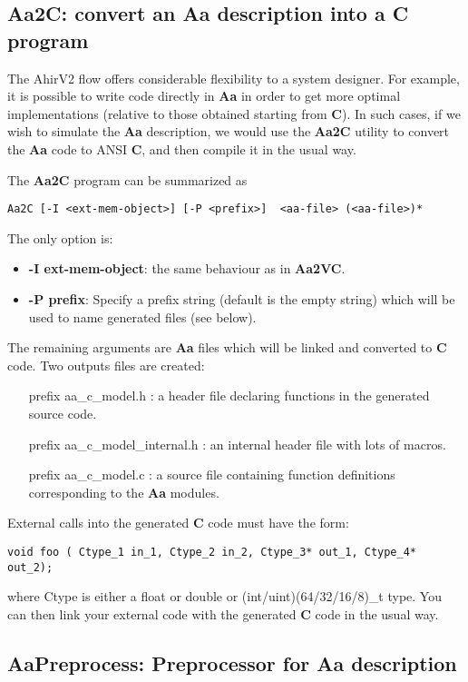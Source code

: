 \subsection{{\bf Aa2C}: convert an {\bf Aa} description into a {\bf C} program}

The AhirV2 flow offers considerable flexibility to a system designer.
For example, it is possible to write code directly in {\bf Aa} in order
to get more optimal implementations (relative to those obtained 
starting from {\bf C}).  In such cases, if we wish to simulate
the {\bf Aa} description, we would use the {\bf Aa2C} utility to
convert the {\bf Aa} code to ANSI {\bf C}, and then compile it
in the usual way.

The {\bf Aa2C} program can be summarized as
\begin{verbatim}
Aa2C [-I <ext-mem-object>] [-P <prefix>]  <aa-file> (<aa-file>)*
\end{verbatim}
The only option is:
\begin{itemize}
\item {\bf -I ext-mem-object}:  the same behaviour as in {\bf Aa2VC}.
\item {\bf -P prefix}:  Specify a prefix string (default is the empty string)
which will be used to name generated files (see below).
\end{itemize}
The remaining arguments are {\bf Aa} files which will be linked and
converted to {\bf C} code.  Two outputs files are created:
\begin{itemize}
\item [prefix]aa\_c\_model.h :  a header file declaring functions in the generated
source code.
\item [prefix]aa\_c\_model\_internal.h :  an internal header file with lots of macros.
\item [prefix]aa\_c\_model.c : a source file containing function definitions
corresponding to the {\bf Aa} modules.
\end{itemize}

External calls into the generated {\bf C} code must have the
form:
\begin{verbatim}
void foo ( Ctype_1 in_1, Ctype_2 in_2, Ctype_3* out_1, Ctype_4* out_2);
\end{verbatim}
where Ctype is either a float or double or (int/uint)(64/32/16/8)\_t type.
You can then link your external code with the generated {\bf C} code
in the usual way.

\subsection{{\bf AaPreprocess}: Preprocessor for {\bf Aa} description}

